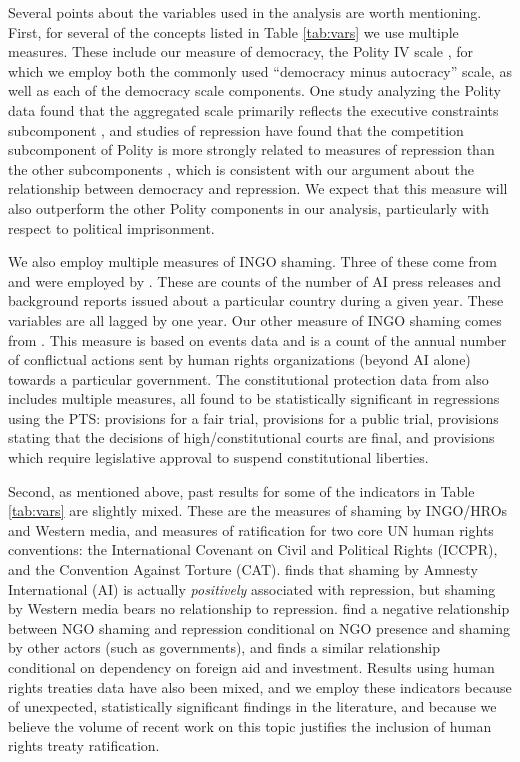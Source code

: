 \documentclass[12pt]{article}
\begin{document}
Several points about the variables used in the analysis are worth mentioning. First, for several of the concepts listed in Table \ref{tab:vars} we use multiple measures. These include our measure of democracy, the Polity IV scale \citep{MarshallJaggers2009}, for which we employ both the commonly used ``democracy minus autocracy'' scale, as well as each of the democracy scale components. One study analyzing the Polity data found that the aggregated scale primarily reflects the executive constraints subcomponent \citep{GleditschWard1997}, and studies of repression have found that the competition subcomponent of Polity is more strongly related to measures of repression than the other subcomponents \citep{Keith2002PRQ, BDMetal2005}, which is consistent with our argument about the relationship between democracy and repression. We expect that this measure will also outperform the other Polity components in our analysis, particularly with respect to political imprisonment. 

We also employ multiple measures of INGO shaming. Three of these come from \citet{RonRamosRodgers2005} and were employed by \citet{HafnerBurton2008}. These are counts of the number of AI press releases and background reports issued about a particular country during a given year. These variables are all lagged by one year. Our other measure of INGO shaming comes from \citet{MurdieDavis2012}. This measure is based on events data and is a count of the annual number of conflictual actions sent by human rights organizations (beyond AI alone) towards a particular government. The constitutional protection data from \citet{KeithTatePoe2009} also includes multiple measures, all found to be statistically significant in regressions using the PTS: provisions for a fair trial, provisions for a public trial, provisions stating that the decisions of high/constitutional courts are final, and provisions which require legislative approval to suspend constitutional liberties. 

Second, as mentioned above, past results for some of the indicators in Table \ref{tab:vars} are slightly mixed. These are the measures of shaming by INGO/HROs and Western media, and measures of ratification for two core UN human rights conventions: the International Covenant on Civil and Political Rights (ICCPR), and the Convention Against Torture (CAT). \citet{HafnerBurton2008} finds that shaming by Amnesty International (AI) is actually {\it positively} associated with repression, but shaming by Western media bears no relationship to repression. \citet{MurdieDavis2012} find a negative relationship between NGO shaming and repression conditional on NGO presence and shaming by other actors (such as governments), and \citet{Franklin2008} finds a similar relationship conditional on dependency on foreign aid and investment. Results using human rights treaties data have also been mixed, and we employ these indicators because of unexpected, statistically significant findings in the literature, and because we believe the volume of recent work on this topic justifies the inclusion of human rights treaty ratification. 
\end{document}
